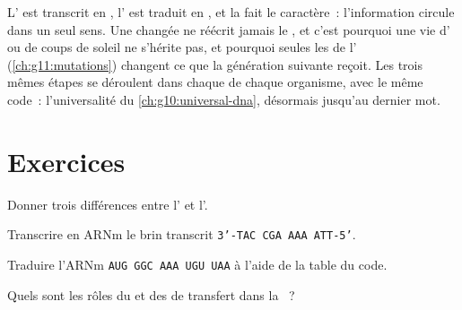 \begin{remark}\label{rem:g11:gene-expression:flow}
L' est transcrit en , l' est traduit en , et la
 fait le caractère~: l'information circule dans un seul sens.
Une  changée ne réécrit jamais le , et c'est pourquoi une
vie d' ou de coups de soleil ne s'hérite pas, et pourquoi
seules les  de l' (\cref{ch:g11:mutations}) changent ce que
la génération suivante reçoit. Les trois mêmes étapes se déroulent dans
chaque  de chaque organisme, avec le même code~: l'universalité
du \cref{ch:g10:universal-dna}, désormais jusqu'au dernier mot.
\end{remark}

\section{Exercices}

\begin{exercise}[$\star$]\label{exo:g11:gene-expression:1}
Donner trois différences entre l' et l'.
\end{exercise}

\begin{exercise}[$\star$]\label{exo:g11:gene-expression:2}
Transcrire en ARNm le brin transcrit \texttt{3'-TAC CGA AAA ATT-5'}.
\end{exercise}

\begin{exercise}[$\star$]\label{exo:g11:gene-expression:3}
Traduire l'ARNm \texttt{AUG GGC AAA UGU UAA} à l'aide de la table du code.
\end{exercise}

\begin{exercise}[$\star$]\label{exo:g11:gene-expression:4}
Quels sont les rôles du  et des  de transfert dans la
~?
\end{exercise}

